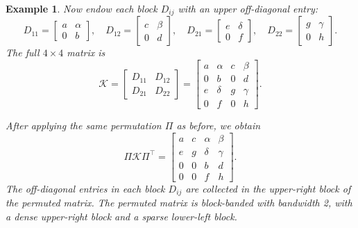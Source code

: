 \documentclass{article}
\newcommand{\K}{\mathcal{K}}
\newtheorem{example}{Example}
\begin{document}
\begin{example}
  Now endow each block $D_{ij}$ with an upper off-diagonal entry:
  \[
    D_{11} = \begin{bmatrix} a & \alpha \\ 0 & b \end{bmatrix}, \quad
    D_{12} = \begin{bmatrix} c & \beta \\ 0 & d \end{bmatrix}, \quad
    D_{21} = \begin{bmatrix} e & \delta \\ 0 & f \end{bmatrix}, \quad
    D_{22} = \begin{bmatrix} g & \gamma \\ 0 & h \end{bmatrix}.
  \]
  The full $4\times4$ matrix is
  \[
    \K = \begin{bmatrix}
      D_{11} & D_{12} \\
      D_{21} & D_{22}
    \end{bmatrix} =
    \begin{bmatrix}
      a & \alpha & c & \beta  \\
      0 & b      & 0 & d      \\
      e & \delta & g & \gamma \\
      0 & f      & 0 & h
    \end{bmatrix}.
  \]

  After applying the same permutation $\Pi$ as before, we obtain
  \[
    \Pi \K \Pi^\top =
    \begin{bmatrix}
      a & c & \alpha & \beta  \\
      e & g & \delta & \gamma \\
      0 & 0 & b      & d      \\
      0 & 0 & f      & h
    \end{bmatrix}.
  \]
  The off-diagonal entries in each block $D_{ij}$ are collected in
  the upper-right block of the permuted matrix. The permuted matrix
  is block-banded with bandwidth 2, with a dense upper-right block and a sparse
  lower-left block.
\end{example}
\end{document}
